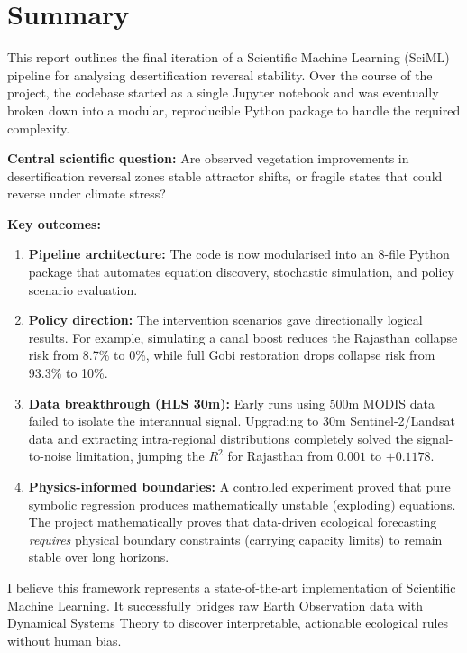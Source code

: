 \documentclass[12pt, a4paper]{article}
\begin{document}
\tableofcontents
\newpage

\section{Summary}

This report outlines the final iteration of a Scientific Machine Learning (SciML) pipeline for analysing desertification reversal stability. Over the course of the project, the codebase started as a single Jupyter notebook and was eventually broken down into a modular, reproducible Python package to handle the required complexity.

\textbf{Central scientific question:} Are observed vegetation improvements in desertification reversal zones stable attractor shifts, or fragile states that could reverse under climate stress?

\textbf{Key outcomes:}
\begin{enumerate}[leftmargin=1.6em]
    \item \textbf{Pipeline architecture:} The code is now modularised into an 8-file Python package that automates equation discovery, stochastic simulation, and policy scenario evaluation.
    \item \textbf{Policy direction:} The intervention scenarios gave directionally logical results. For example, simulating a canal boost reduces the Rajasthan collapse risk from 8.7\% to 0\%, while full Gobi restoration drops collapse risk from 93.3\% to 10\%.
    \item \textbf{Data breakthrough (HLS 30m):} Early runs using 500m MODIS data failed to isolate the interannual signal. Upgrading to 30m Sentinel-2/Landsat data and extracting intra-regional distributions completely solved the signal-to-noise limitation, jumping the $R^2$ for Rajasthan from $0.001$ to $+0.1178$.
    \item \textbf{Physics-informed boundaries:} A controlled experiment proved that pure symbolic regression produces mathematically unstable (exploding) equations. The project mathematically proves that data-driven ecological forecasting \emph{requires} physical boundary constraints (carrying capacity limits) to remain stable over long horizons.

\end{enumerate}

I believe this framework represents a state-of-the-art implementation of Scientific Machine Learning. It successfully bridges raw Earth Observation data with Dynamical Systems Theory to discover interpretable, actionable ecological rules without human bias.
\end{document}
